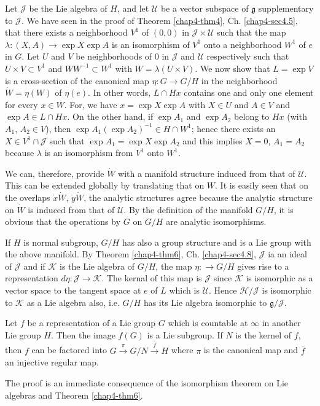 Let $\mathscr{J}$ be the Lie algebra of $H$, and let $\mathcal{U}$ be
a vector subspace of $\mathfrak{g}$ supplementary to $\mathscr{J}$. We
have seen in the proof of Theorem \ref{chap4-thm4},
Ch. \ref{chap4-sec4.5}, that there exists a 
neighborhood $V^1$ of $(0,0)$ in $\mathscr{J} \times \mathcal{U}$  such
that the  
map $\lambda:(X,A) \rightarrow \exp X \exp A$ is an isomorphism of
$V^1$ onto a neighborhood $W^1$ of $e$ in $G$. Let $U$ and $V$ be
neighborhoods of $0$ in $\mathscr{J}$ and $\mathcal{U}$ respectively
such that $U \times V \subset V^1$ and $W W^{-1} \subset W^{1}$ with
$W=\lambda(U\times V)$. 
We now show that $L = \exp V$ is a cross-section of the canonical map
$\eta : G \rightarrow G/H$ in the neighborhood $\dot{W} = \eta (W)$
of $\eta (e)$. In other words, $L\cap Hx$ contains one and only one
element for every $x\in  W$. For, we have $x=\exp X \exp  
A$ with $X \in U$ and $A \in V$  and $\exp A  \in  L \cap Hx$. On the
other hand, if $\exp A_1$ and $\exp A_2$ belong to $Hx$ (with $A_1$, $A_2
\in V$), then $\exp A_1 (\exp A_2)^{-1} \in H \cap W^1$;\pageoriginale 
hence there exists an $X \in V^1 \cap \mathscr{J}$ such that $\exp A_1= 
\exp X \exp A_2$  and this implies $X=0$, $A_1 = A_2$ because
$\lambda$ is an isomorphism from $V^1$ onto $W^1$. 

We can, therefore, provide $\dot{W}$ with a manifold structure induced
from that of $\mathcal{U}$. This can be extended globally by
translating that on $W$. It is easily seen that on the overlaps
$\dot{x} \dot{W}$, $ \dot{y} \dot{W}$, the analytic structures agree
because the analytic structure on $\dot{W}$ is induced from that of
$\mathcal{U}$. By the definition of the manifold $G/H$, it is obvious
that the operations by $G$ on $G/H$ are analytic isomorphisms.  

If $H$ is normal subgroup, $G/H$ has also a group structure and is a
Lie group with the above manifold. By Theorem \ref{chap4-thm6},
Ch. \ref{chap4-sec4.8}, 
$\mathscr{J}$ ia an ideal of $\mathscr{J}$ and if $\mathcal{K}$ is the
Lie algebra of $G/H$, the map $\eta :\rightarrow G/H$  
gives rise to a representation $d\eta :\mathscr{J} \rightarrow
\mathcal{K}$. The kernal of this map is $\mathscr{J}$ since
$\mathcal{K}$ is isomorphic as a vector space to the tangent space at
$e$ of $L$ which is $\mathcal{U}$. Hence $\mathscr{H}/\mathscr{J}$ is
isomorphic to $\mathcal{K}$ as a Lie algebra also, i.e. $G/H$ has its
Lie algebra isomorphic to $\mathfrak{g}/\mathscr{J}$. 

\begin{coro*}
 Let $f$ be a representation of a Lie group $G$ which is countable at
 $\infty$ in another  Lie group $H$. Then the image $f(G)$ is a Lie
 subgroup. If $N$ is the kernel of $f$, then $f$ can be factored into
 $G \xrightarrow{\pi} G/N \xrightarrow{\bar{f}}H$ where $\pi$ is the
 canonical map and $\bar{f}$ an injective regular map. 
\end{coro*}
 
The proof is an immediate consequence of the isomorphism theorem on
Lie algebras and Theorem \ref{chap4-thm6}. 

